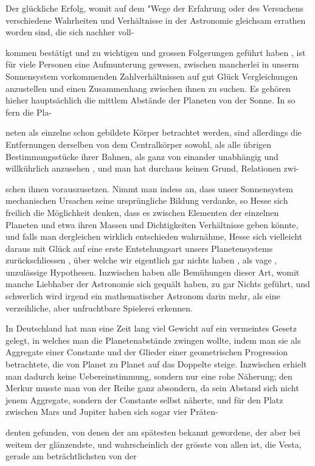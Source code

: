 \documentclass[10pt,a4paper]{article}
\begin{document}
Der glückliche Erfolg, womit auf dem "Wege der Erfahrung oder des Versuchens verschiedene Wahrheiten und Verhältnisse in der Astronomie gleichsam errathen worden sind, die sich nachher voll-

kommen bestätigt und zu wichtigen und grossen Folgerungen geführt haben , ist für viele Personen eine Aufmunterung gewesen, zwischen mancherlei in unserm Sonnensystem vorkommenden Zahlverhältnissen auf gut Glück Vergleichungen anzustellen und einen Zusammenhang zwischen ihnen zu suchen. Es gehören hieher hauptsächlich die mittlem Abstände der Planeten von der Sonne. In so fern die Pla-

neten als einzelne schon gebildete Körper betrachtet werden, sind allerdings die Entfernungen derselben von dem Centralkörper sowohl, als alle übrigen Bestimmungsstücke ihrer Bahnen, als ganz von einander unabhängig und willkührlich anzusehen , und man hat durchaus keinen Grund, Relationen zwi-

schen ihnen vorauszusetzen. Nimmt man indess an, dass unser Sonnensystem mechanischen Ursachen seine ursprüngliche Bildung verdanke, so Hesse sich freilich die Möglichkeit denken, dass es zwischen Elementen der einzelnen Planeten und etwa ihren Massen und Dichtigkeiten Verhältnisse geben könnte, und falls man dergleichen wirklich entschieden wahrnähme, Hesse sich vielleicht daraus mit Glück auf eine erste Entstehungsart unsers Planetensystems zurückschliessen , über welche wir eigentlich gar nichts haben , als vage , unzulässige Hypothesen. Inzwischen haben alle Bemühungen dieser Art, womit manche Liebhaber der Astronomie sich gequält haben, zu gar Nichts geführt, und schwerlich wird irgend ein mathematischer Astronom darin mehr, als eine verzeihliche, aber unfruchtbare Spielerei erkennen.

In Deutschland hat man eine Zeit lang viel Gewicht auf ein vermeintes Gesetz gelegt, in welches man die Planetenabstände zwingen wollte, indem man sie als Aggregate einer Constante und der Glieder einer geometrischen Progression betrachtete, die von Planet zu Planet auf das Doppelte steige. Inzwischen erhielt man dadurch keine Uebereinstimmung, sondern nur eine rohe Näherung; den Merkur musste man von der Reihe ganz absondern, da sein Abstand sich nicht jenem Aggregate, sondern der Constante selbst näherte, und für den Platz zwischen Mars und Jupiter haben sich sogar vier Präten-

denten gefunden, von denen der am spätesten bekannt gewordene, der aber bei weitem der glänzendste, und wahrscheinlich der grösste von allen ist, die Vesta, gerade am beträchtlichsten von der
\end{document}
